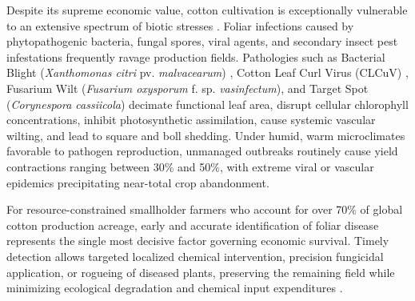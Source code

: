 \documentclass[journal,10pt,twocolumn]{IEEEtran}
\begin{document}
Despite its supreme economic value, cotton cultivation is exceptionally vulnerable to an extensive spectrum of biotic stresses \cite{delannoy2005cotton, sattar2013cotton}. Foliar infections caused by phytopathogenic bacteria, fungal spores, viral agents, and secondary insect pest infestations frequently ravage production fields. Pathologies such as Bacterial Blight (\textit{Xanthomonas citri} pv. \textit{malvacearum}) \cite{delannoy2005cotton}, Cotton Leaf Curl Virus (CLCuV) \cite{sattar2013cotton}, Fusarium Wilt (\textit{Fusarium oxysporum} f. sp. \textit{vasinfectum}), and Target Spot (\textit{Corynespora cassiicola}) decimate functional leaf area, disrupt cellular chlorophyll concentrations, inhibit photosynthetic assimilation, cause systemic vascular wilting, and lead to square and boll shedding. Under humid, warm microclimates favorable to pathogen reproduction, unmanaged outbreaks routinely cause yield contractions ranging between 30\% and 50\%, with extreme viral or vascular epidemics precipitating near-total crop abandonment.

For resource-constrained smallholder farmers who account for over 70\% of global cotton production acreage, early and accurate identification of foliar disease represents the single most decisive factor governing economic survival. Timely detection allows targeted localized chemical intervention, precision fungicidal application, or rogueing of diseased plants, preserving the remaining field while minimizing ecological degradation and chemical input expenditures \cite{manavalan2022automated}.
\end{document}

